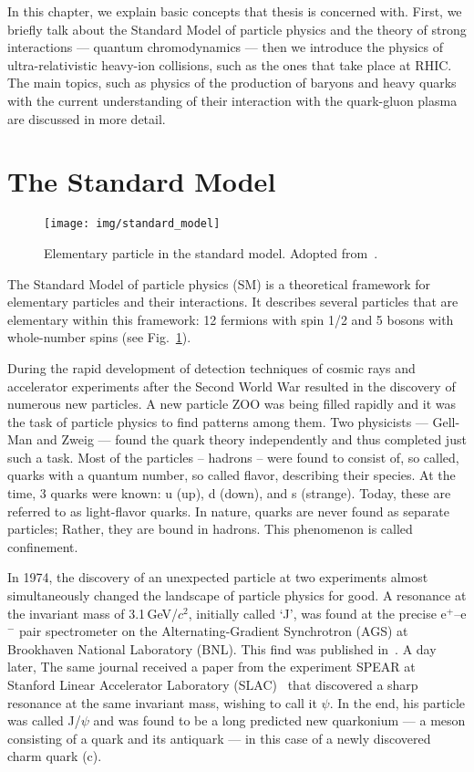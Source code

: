 In this chapter, we explain basic concepts that thesis is concerned with. First, we briefly talk about the Standard Model of particle physics and the theory of strong interactions --- quantum chromodynamics --- then we introduce the physics of ultra-relativistic heavy-ion collisions, such as the ones that take place at RHIC\@. The main topics, such as physics of the production of baryons and heavy quarks with the current understanding of their interaction with the quark-gluon plasma are discussed in more detail.

\section{The Standard Model}

\begin{figure}[!htb]
\centering
\texttt{[image: img/standard\_model]}
\caption[Elementary particle in the standard model.]{\label{standard_model}Elementary particle in the standard model. Adopted from~\cite{standardModel}\@.}
\end{figure}

The Standard Model of particle physics (SM) is a theoretical framework for elementary particles and their interactions. It describes several particles that are elementary within this framework: 12 fermions with spin 1/2 and 5 bosons with whole-number spins (see Fig.\ \ref{standard_model})\@.

During the rapid development of detection techniques of cosmic rays and accelerator experiments after the Second World War resulted in the discovery of numerous new particles. A new particle ZOO was being filled rapidly and it was the task of particle physics to find patterns among them. Two physicists --- Gell-Man and Zweig --- found the quark theory independently and thus completed just such a task. Most of the particles -- hadrons -- were found to consist of, so called, quarks with a quantum number, so called flavor, describing their species. At the time, 3 quarks were known: u (up), d (down), and s (strange)\@. Today, these are referred to as light-flavor quarks. In nature, quarks are never found as separate particles; Rather, they are bound in hadrons. This phenomenon is called confinement.

In 1974, the discovery of an unexpected particle at two experiments almost simultaneously changed the landscape of particle physics for good. A resonance at the invariant mass of 3.1$\,$GeV/$c^2$, initially called `J', was found at the precise e$^+$--e$^-$ pair spectrometer on the Alternating-Gradient Synchrotron (AGS) at Brookhaven National Laboratory (BNL)\@. This find was published in~\cite{JpsiBNL}. A day later, The same journal received a paper from the experiment SPEAR at Stanford Linear Accelerator Laboratory (SLAC)~\cite{JpsiSLAC} that discovered a sharp resonance at the same invariant mass, wishing to call it $\psi$\@. In the end, his particle was called J/$\psi$ and was found to be a long predicted new quarkonium --- a meson consisting of a quark and its antiquark --- in this case of a newly discovered charm quark (c)\@.

